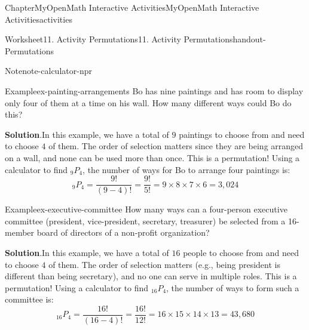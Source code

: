 \documentclass[oneside,10pt,]{book}
\newcommand{\blocktitlefont}{\relax}
\newlength{\fillinmaxwidth}
\newlength{\fillincontract}
\newlength{\charmaxwidth}\setlength{\charmaxwidth}{0.5em}
\newlength{\charminwidth}\setlength{\charminwidth}{0.1em}
\newlength{\fillinheight}
\newcommand{\fillintext}[1]{%
\setlength{\fillinmaxwidth}{#1\charmaxwidth}%
\setlength{\fillincontract}{#1\charminwidth}%
\setlength{\fillinheight}{\baselineskip}\addtolength{\fillinheight}{1.2pt}%
\strut\nobreak\leaders\vbox{\hrule width 0.3pt height 0.3pt \vskip -1.2pt}\hskip 1\fillinmaxwidth minus \fillincontract\nobreak\strut%
}
\begin{document}
\begin{chapterptx}{Chapter}{MyOpenMath Interactive Activities}{}{MyOpenMath Interactive Activities}{}{}{activities}
\begin{worksheet-section}{Worksheet}{11. Activity Permutations}{}{11. Activity Permutations}{}{}{handout-Permutations}
\begin{note}{Note}{}{note-calculator-npr}
\end{note}
\clearpage
\begin{example}{Example}{}{ex-painting-arrangements}%
Bo has nine paintings and has room to display only four of them at a time on his wall. How many different ways could Bo do this?%
\par\smallskip%
\noindent\textbf{\blocktitlefont Solution}.\hypertarget{ex-painting-arrangements-2}{}\quad{}In this example, we have a total of \(9\) paintings to choose from and need to choose \(4\) of them. The order of selection matters since they are being arranged on a wall, and none can be used more than once. This is a permutation! Using a calculator to find \(_9P_4\), the number of ways for Bo to arrange four paintings is:%
\begin{equation*}
_9P_4 = \frac{9!}{(9-4)!} = \frac{9!}{5!} = 9 \times 8 \times 7 \times 6 = 3,024
\end{equation*}
%
\end{example}
\begin{example}{Example}{}{ex-executive-committee}%
How many ways can a four-person executive committee (president, vice-president, secretary, treasurer) be selected from a 16-member board of directors of a non-profit organization?%
\par\smallskip%
\noindent\textbf{\blocktitlefont Solution}.\hypertarget{ex-executive-committee-2}{}\quad{}In this example, we have a total of \(16\) people to choose from and need to choose \(4\) of them. The order of selection matters (e.g., being president is different than being secretary), and no one can serve in multiple roles. This is a permutation! Using a calculator to find \(_{16}P_4\), the number of ways to form such a committee is:%
\begin{equation*}
_{16}P_4 = \frac{16!}{(16-4)!} = \frac{16!}{12!} = 16 \times 15 \times 14 \times 13 = 43,680
\end{equation*}
%
\end{example}
\clearpage
{}
\end{worksheet-section}
\end{chapterptx}
\end{document}
